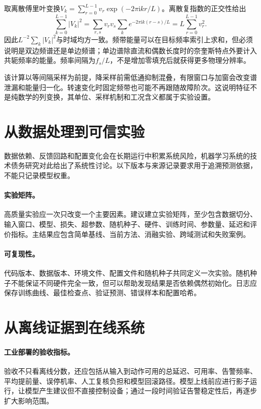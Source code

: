 取离散傅里叶变换$V_k=\sum_{r=0}^{L-1}v_r\exp(-2\pi\mathrm{i}kr/L)$。离散复指数的正交性给出
\begin{equation}
 \sum_{k=0}^{L-1}|V_k|^2
 =\sum_{r,s}v_rv_s\sum_k e^{-2\pi\mathrm{i}k(r-s)/L}
 =L\sum_{r=0}^{L-1}v_r^2.
\end{equation}
因此$L^{-2}\sum_k|V_k|^2$与时域均方一致。频带能量可以在目标频率索引上求和，但必须说明是双边频谱还是单边频谱；单边谱除直流和偶数长度时的奈奎斯特点外要计入共轭频率的能量。频率间隔为$f_s/L$，不是增加零填充后就获得更多物理分辨率。

该计算以等间隔采样为前提，降采样前需低通抑制混叠，有限窗口与加窗会改变谱泄漏和能量归一化。转速变化时固定频带也可能不再跟随故障阶次。这说明特征不是纯数学的列变换，其单位、采样机制和工况含义都属于实验设置。

\section{从数据处理到可信实验}
数据依赖、反馈回路和配置变化会在长期运行中积累系统风险，机器学习系统的技术债务研究对此给出了系统性讨论\cite{sculley2015debt}。以下版本与来源记录要求用于追溯预测依据，不能只记录模型权重。
\paragraph{实验矩阵。}
高质量实验应一次只改变一个主要因素。建议建立实验矩阵，至少包含数据切分、输入窗口、模型、损失、超参数、随机种子、硬件、训练时间、参数量、延迟和评价指标。主结果应包含简单基线、当前方法、消融实验、跨域测试和失败案例。

\paragraph{可复现性。}
代码版本、数据版本、环境文件、配置文件和随机种子共同定义一次实验。随机种子不能保证不同硬件完全一致，但可以帮助发现结果是否依赖偶然初始化。日志应保存训练曲线、最佳检查点、验证预测、错误样本和配置哈希。

\section{从离线证据到在线系统}
\paragraph{工业部署的验收指标。}
验收不只看离线分数，还应包括从输入到动作可用的总延迟、可用率、告警频率、平均提前量、误停机率、人工复核负担和模型回滚路径。模型上线前应进行影子运行，让模型产生建议但不直接控制设备；通过一段时间验证告警稳定性后，再逐步扩大影响范围。

